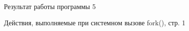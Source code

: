 \documentclass[a4paper,oneside,14pt]{extreport}
\begin{document}
\begin{figure}[h]
	\caption{Результат работы программы 5}
	\label{5png}
\end{figure}

\newpage
\begin{figure}[h]
	\caption{Действия, выполняемые при системном вызове fork(), стр. 1}
	\label{fork1}
\end{figure}
\end{document}
